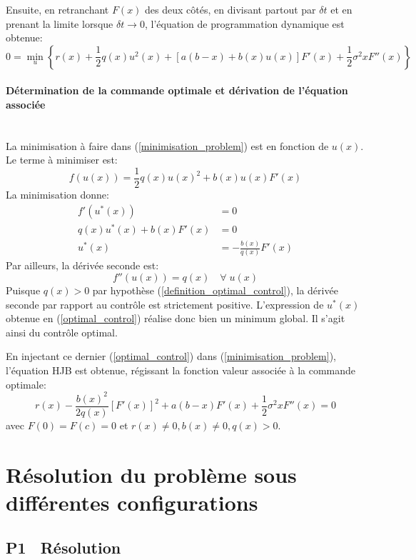 Ensuite, en retranchant $F(x)$ des deux côtés, en divisant partout par $\delta t$ et en prenant la limite lorsque $\delta t\to0$, l'équation de programmation dynamique est obtenue:
\begin{equation}\label{minimisation_problem}
    0=\min_u\left\{r(x)+\frac{1}{2}q(x)u^2(x)+[a(b-x)+b(x)u(x)]F'(x)+\frac{1}{2}\sigma^2xF''(x)\right\}
\end{equation}
\paragraph{Détermination de la commande optimale et dérivation de l'équation associée}\phantom{}\\
La minimisation à faire dans (\ref{minimisation_problem}) est en fonction de $u(x)$. Le terme à minimiser est:
\[
f(u(x))=\frac{1}{2}q(x){u(x)}^2+b(x)u(x)F'(x)
\]
La minimisation donne:
\begin{equation}\label{optimal_control}
    \begin{aligned}
        f'(u^*(x))&=0\\
        q(x)u^*(x)+b(x)F'(x)&=0\\
    u^*(x)&=-\frac{b(x)}{q(x)}F'(x)
    \end{aligned}
\end{equation}
Par ailleurs, la dérivée seconde est: 
\[
f''(u(x))=q(x)\quad\forall\;u(x)
\]
Puisque \( q(x) > 0 \) par hypothèse (\ref{definition_optimal_control}), la dérivée seconde par rapport au contrôle est strictement positive. L'expression de \( u^*(x) \) obtenue en (\ref{optimal_control}) réalise donc bien un minimum global. Il s'agit ainsi du contrôle optimal.

En injectant ce dernier (\ref{optimal_control}) dans (\ref{minimisation_problem}), l'équation \acl{HJB} est obtenue, régissant la fonction valeur associée à la commande optimale:
\begin{equation}\label{control_equation}
    r(x) - \frac{{b(x)}^2}{2q(x)}{\left[F'(x)\right]}^2 + a(b - x)F'(x) + \frac{1}{2}\sigma^2 x F''(x) = 0
\end{equation}
avec $F(0)=F(c)=0$ et $r(x)\neq0, b(x)\neq0, q(x)>0$.


\section{Résolution du problème sous différentes configurations}
\subsection{P1 \textemdash~Résolution}\label{p1}

